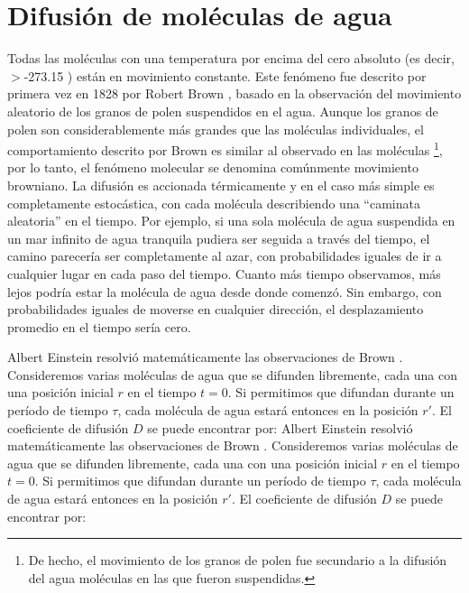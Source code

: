 

\section{Difusión de moléculas de agua}

Todas las moléculas con una temperatura por encima del cero absoluto (es decir, $>$-273.15 \degrees) están en movimiento constante. Este fenómeno fue descrito por primera vez en 1828 por Robert Brown \cite{Brown1828}, basado en la observación del movimiento aleatorio de los granos de polen suspendidos en el agua. Aunque los granos de polen son considerablemente más grandes que las moléculas individuales, el comportamiento descrito por Brown es similar al observado en las moléculas \footnote{De hecho, el movimiento de los granos de polen fue secundario a la difusión del agua moléculas en las que fueron suspendidas.}, por lo tanto, el fenómeno molecular se denomina comúnmente movimiento browniano. La difusión es accionada térmicamente y en el caso más simple es completamente estocástica, con cada molécula describiendo una ``caminata aleatoria'' en el tiempo. Por ejemplo, si una sola molécula de agua suspendida en un mar infinito de agua tranquila pudiera ser seguida a través del tiempo, el camino parecería ser completamente al azar, con probabilidades iguales de ir a cualquier lugar en cada paso del tiempo. Cuanto más tiempo observamos, más lejos podría estar la molécula de agua desde donde comenzó. Sin embargo, con probabilidades iguales de moverse en cualquier dirección, el desplazamiento promedio en el tiempo sería cero.

Albert Einstein resolvió matemáticamente las observaciones de Brown \cite{Einstein1905}. Consideremos varias moléculas de agua que se difunden libremente, cada una con una posición inicial $r$ en el tiempo {$t = 0$}. Si permitimos que  difundan durante un período de tiempo \(\tau\), cada molécula de agua estará entonces en la posición {$r'$}. El coeficiente de difusión {$D$} se puede encontrar por:
Albert Einstein resolvió matemáticamente las observaciones de Brown \cite{Einstein1905}. Consideremos varias moléculas de agua que se difunden libremente, cada una con una posición inicial $r$ en el tiempo {$t = 0$}. Si permitimos que  difundan durante un período de tiempo \(\tau\), cada molécula de agua estará entonces en la posición {$r'$}. El coeficiente de difusión {$D$} se puede encontrar por:

